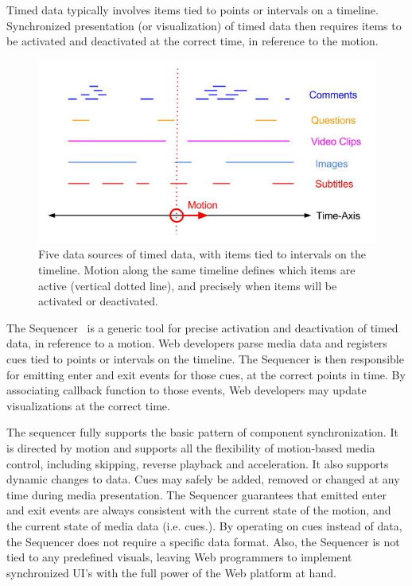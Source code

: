 
Timed data typically involves items tied to points or intervals on a timeline.
Synchronized presentation (or visualization) of timed data then requires items
to be activated and deactivated at the correct time, in reference to the
motion.

\begin{figure}[h]
\centering
\includegraphics[scale=.4]{fig/sequencer.jpg}
\caption{Five data sources of timed data, with items tied to intervals on the timeline. Motion along the same timeline defines which items are active (vertical dotted line), and precisely when items will be activated or deactivated.}
\label{fig:sequencer}
\end{figure}


The Sequencer~\cite{sequencer} is a generic tool for precise activation and
deactivation of timed data, in reference to a motion. Web developers parse
media data and registers cues tied to points or intervals on the timeline. The
Sequencer is then responsible for emitting enter and exit events for those
cues, at the correct points in time. By associating callback function to those
events, Web developers may update visualizations at the correct time.

The sequencer fully supports the basic pattern of component synchronization.
It is directed by motion and supports all the flexibility of motion-based
media control, including skipping, reverse playback and acceleration. It also
supports dynamic changes to data. Cues may safely be added, removed or changed
at any time during media presentation. The Sequencer guarantees that emitted
enter and exit events are always consistent with the current state of the
motion, and the current state of media data (i.e. cues.). By operating on cues
instead of data, the Sequencer does not require a specific data format. Also,
the Sequencer is not tied to any predefined visuals, leaving Web programmers
to implement synchronized UI’s with the full power of the Web platform at
hand.

